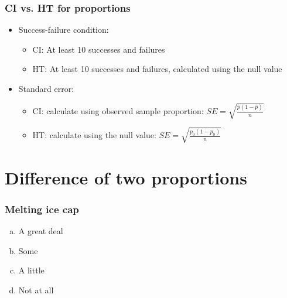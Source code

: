 \documentclass[slidestop,compress,mathserif]{beamer}
\begin{document}

\begin{frame}
\frametitle{CI vs. HT for proportions}

\begin{itemize}

\item Success-failure condition:
\begin{itemize}
\item CI: At least 10  successes and failures
\item HT: At least 10  successes and failures, calculated using the null value
\end{itemize}

\item Standard error:
\begin{itemize}
\item CI: calculate using observed sample proportion: $SE = \sqrt{\frac{\hat{p}(1-\hat{p})}{n}}$
\item HT: calculate using the null value: $SE = \sqrt{\frac{p_0(1-p_0)}{n}}$
\end{itemize}

\end{itemize}

\end{frame}


\section{Difference of two proportions}


\begin{frame}
\frametitle{Melting ice cap}


\begin{enumerate}[(a)]
\item A great deal
\item Some
\item A little
\item Not at all
\end{enumerate}

\end{frame}
\end{document}
